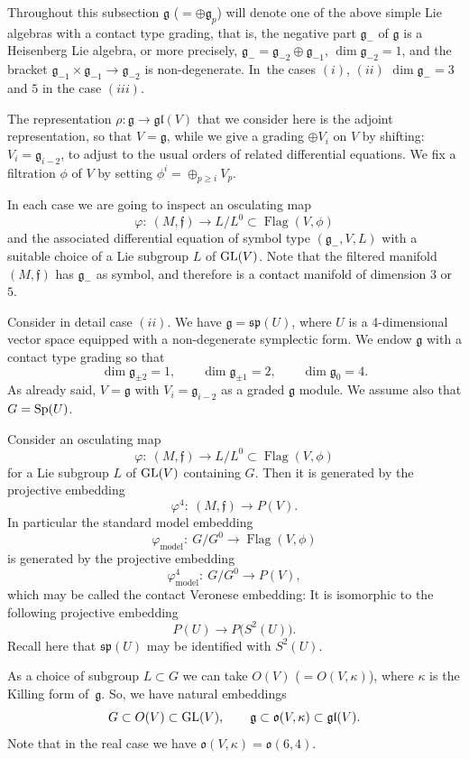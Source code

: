 \documentclass[pdftex]{sigma}%
\newcommand{\g}{\mathfrak g}
\newcommand{\Flag}{\operatorname{Flag}}
\numberwithin{equation}{section}
\begin{document}
Throughout this subsection $\g$ ($= \oplus\g_p$) will denote one of the above simple Lie algebras with a contact type grading, that is, the negative part $\g_-$ of $\g$ is a Heisenberg Lie algebra, or more precisely, $\g_- = \g_{-2} \oplus \g_{-1}$, $\dim \g_{-2} = 1 $, and the bracket $\g_{-1} \times \g _{-1} \to \g_{-2}$
is non-degenerate. In~the cases $(i)$, $(ii)$ $\dim \g_- = 3$ and $5$ in the case $(iii)$.

The representation $\rho\colon \g \to \mathfrak{gl}(V)$ that we consider here is the adjoint representation, so that $V = \g$, while we give a grading $\oplus V_i $ on $V$ by shifting: $V_i = \g_{i-2}$, to adjust to the usual orders of related differential equations. We fix a filtration $\phi$ of $V$ by setting $\phi^i = \oplus_{p \ge i }V_p$.

In each case we are going to inspect an osculating map
\[
\varphi \colon\ (M, \mathfrak f ) \to L/ L^0 \subset \Flag(V,\phi)
\]
and the associated differential equation of symbol type $(\g_-, V, L)$ with a suitable choice of a Lie subgroup $L$ of ${\rm GL}(V)$. Note that the filtered manifold $(M, \mathfrak f)$ has $\g_-$ as symbol, and therefore is a contact manifold of dimension $3$ or $5$.

Consider in detail case $(ii)$. We have $\g=\mathfrak{sp}(U)$, where $U$ is a 4-dimensional vector space equipped with a non-degenerate symplectic form. We endow $\g$ with a contact type grading so that
\[
	\dim \g_{\pm 2} = 1,\qquad \dim \g_{\pm1}=2,\qquad \dim\g_0=4.
\]
As already said, $V = \g$ with $V_i = \mathfrak g_{i-2}$ as a graded $\g$ module. We assume also that $G = {\rm Sp}(U)$.

Consider an osculating map
\[
	\varphi\colon\ (M, \mathfrak f) \to L/L^0 \subset \Flag(V, \phi)
\]
for a Lie subgroup $L$ of ${\rm GL}(V)$ containing $G$. Then it is generated by the projective embedding
\[
	\varphi^4 \colon\ (M, \mathfrak f ) \to P(V).
\]
In particular the standard model embedding
\[
	\varphi_{\mathrm{model}} \colon\ G/G^0 \to \Flag(V, \phi)
\]
is generated by the projective embedding
\[
	\varphi^4_{\mathrm{model}} \colon\ G/G^0 \to P(V),
\]
which may be called the contact Veronese embedding: It is isomorphic to the following projective embedding
\[
	P(U) \to P\big(S^2(U)\big).
\]
Recall here that $\mathfrak{sp}(U)$ may be identified with $S^2(U)$.

As a choice of subgroup $L\subset G$ we can take $O(V)$ ($=O(V,\kappa)$), where $\kappa$ is the Killing form of~$\g$. So, we have natural embeddings
\[
G\subset O(V)\subset {\rm GL}(V), \qquad \g\subset \mathfrak{o}(V,\kappa)\subset \mathfrak{gl}(V).
\]
Note that in the real case we have $\mathfrak{o}(V,\kappa)=\mathfrak{o}(6,4)$.
\end{document}
